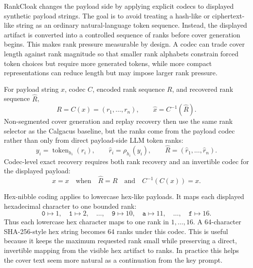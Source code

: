 \documentclass[fleqn,10pt]{wlscirep}
\begin{document}
RankCloak changes the payload side by applying explicit codecs to displayed synthetic payload strings. The goal is to avoid treating a hash-like or ciphertext-like string as an ordinary natural-language token sequence. Instead, the displayed artifact is converted into a controlled sequence of ranks before cover generation begins. This makes rank pressure measurable by design. A codec can trade cover length against rank magnitude so that smaller rank alphabets constrain forced token choices but require more generated tokens, while more compact representations can reduce length but may impose larger rank pressure.

For payload string \(x\), codec \(C\), encoded rank sequence \(R\), and recovered rank sequence \(\hat R\),
\begin{equation}
R=C(x)=(r_1,\ldots,r_n),
\qquad
\hat x=C^{-1}(\hat R).
\label{eq:rankcloak-codec}
\end{equation}
Non-segmented cover generation and replay recovery then use the same rank selector as the Calgacus baseline, but the ranks come from the payload codec rather than only from direct payload-side LLM token ranks:
\begin{equation}
y_i=\operatorname{token}_{h_i}(r_i),
\qquad
\hat r_i=\rho_{h_i}(y_i),
\qquad
\hat R=(\hat r_1,\ldots,\hat r_n).
\label{eq:rankcloak-nonseg}
\end{equation}
Codec-level exact recovery requires both rank recovery and an invertible codec for the displayed payload:
\begin{equation}
\hat x=x
\quad\text{when}\quad
\hat R=R
\quad\text{and}\quad
C^{-1}(C(x))=x.
\label{eq:codec-exact-recovery}
\end{equation}

Hex-nibble coding applies to lowercase hex-like payloads. It maps each displayed hexadecimal character to one bounded rank:
\begin{equation}
\texttt{0}\mapsto 1,\quad
\texttt{1}\mapsto 2,\quad
\ldots,\quad
\texttt{9}\mapsto 10,\quad
\texttt{a}\mapsto 11,\quad
\ldots,\quad
\texttt{f}\mapsto 16.
\label{eq:hex-nibble-map}
\end{equation}
Thus each lowercase hex character maps to one rank in \(1,\ldots,16\). A 64-character SHA-256-style hex string becomes 64 ranks under this codec. This is useful because it keeps the maximum requested rank small while preserving a direct, invertible mapping from the visible hex artifact to ranks. In practice this helps the cover text seem more natural as a continuation from the key prompt.
\end{document}
